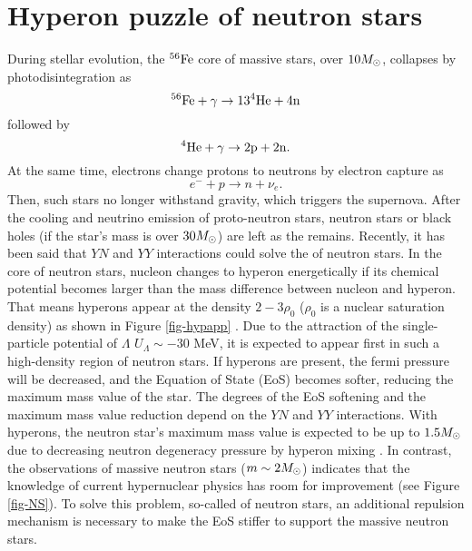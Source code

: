 \section{Hyperon puzzle of neutron stars}
During stellar evolution, the $\rm{^{56}Fe}$ core of massive stars, over $10M_\odot$, collapses by photodisintegration as 
\begin{equation}
  \rm{^{56}Fe} + \gamma \to 13\rm{^4He} + 4n 
\end{equation}
followed by 
\begin{equation}
  \rm{^4He} + \gamma \to 2p + 2n.
\end{equation}
At the same time, electrons change protons to neutrons by electron capture as 
\begin{equation}
  e^- + p \to n + \nu_e.
\end{equation}
Then, such stars no longer withstand gravity, which triggers the supernova. After the cooling and neutrino emission of proto-neutron stars, neutron stars or black holes (if the star's mass is over $30 M_\odot$) are left as the remains. 
Recently, it has been said that $YN$ and $YY$ interactions could solve the  of neutron stars. In the core of neutron stars, nucleon changes to hyperon energetically if its chemical potential becomes larger than the mass difference between nucleon and hyperon. That means hyperons appear at the density $2-3 \rho_0$ ($\rho_0$ is a nuclear saturation density) as shown in Figure \ref{fig-hypapp} \cite{RMF-2008}. Due to the attraction of the single-particle potential of $\Lambda$ $U_\Lambda\sim-30$ MeV, it is expected to appear first in such a high-density region of neutron stars. If hyperons are present, the fermi pressure will be decreased, and the Equation of State (EoS) becomes softer, reducing the maximum mass value of the star. The degrees of the EoS softening and the maximum mass value reduction depend on the $YN$ and $YY$ interactions.
With hyperons, the neutron star's maximum mass value is expected to be up to $1.5M_\odot$ due to decreasing neutron degeneracy pressure by hyperon mixing \cite{BHF-2008}. In contrast, the observations of massive neutron stars ($m\sim2M_\odot$) \cite{NS-1} \cite{NS-2} indicates that the knowledge of current hypernuclear physics has room for improvement (see Figure \ref{fig-NS}). To solve this problem, so-called  of neutron stars, an additional repulsion mechanism is necessary to make the EoS stiffer to support the massive neutron stars. 

